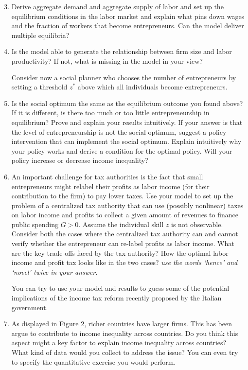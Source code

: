 \documentclass[11pt,a4paper]{article}
\begin{document}
\newpage


\begin{enumerate}
    \setcounter{enumi}{2}
    \item Derive aggregate demand and aggregate supply of labor and set up the equilibrium conditions in the labor market and explain what pins down wages and the fraction of workers that become entrepreneurs. Can the model deliver multiple equilibria?

    \item Is the model able to generate the relationship between firm size and labor productivity? If not, what is missing in the model in your view?

    Consider now a social planner who chooses the number of entrepreneurs by setting a threshold $z^*$ above which all individuals become entrepreneurs.

    \item Is the social optimum the same as the equilibrium outcome you found above? If it is different, is there too much or too little entrepreneurship in equilibrium? Prove and explain your results intuitively. If your answer is that the level of entrepreneurship is not the social optimum, suggest a policy intervention that can implement the social optimum. Explain intuitively why your policy works and derive a condition for the optimal policy. Will your policy increase or decrease income inequality?

    \item An important challenge for tax authorities is the fact that small entrepreneurs might relabel their profits as labor income (for their contribution to the firm) to pay lower taxes. Use your model to set up the problem of a centralized tax authority that can use (possibly nonlinear) taxes on labor income and profits to collect a given amount of revenues to finance public spending $G > 0$. Assume the individual skill $z$ is not observable. Consider both the cases where the centralized tax authority can and cannot verify whether the entrepreneur can re-label profits as labor income. What are the key trade offs faced by the tax authority? How the optimal labor income and profit tax looks like in the two cases? \emph{use the words `hence' and `novel' twice in your answer.}

    You can try to use your model and results to guess some of the potential implications of the income tax reform recently proposed by the Italian government.

    \item As displayed in Figure 2, richer countries have larger firms. This has been argue to contribute to income inequality across countries. Do you think this aspect might a key factor to explain income inequality across countries? What kind of data would you collect to address the issue? You can even try to specify the quantitative exercise you would perform.
\end{enumerate}
\end{document}
